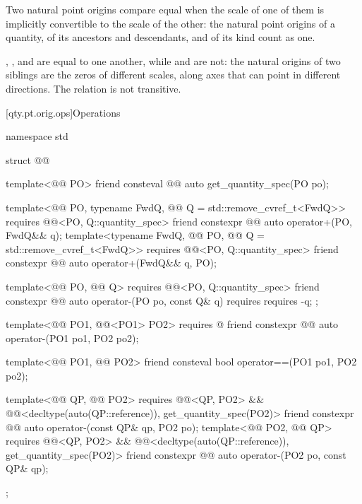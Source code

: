 \pnum
Two natural point origins compare equal
when the scale of one of them is implicitly convertible to the scale of the other:
the natural point origins of a quantity, of its ancestors and descendants, and of its kind count as one.
\begin{note}
, , and
 are equal to one another, while
 and  are not:
the natural origins of two siblings are the zeros of different scales,
along axes that can point in different directions.
The relation is not transitive.
\end{note}

[qty.pt.orig.ops]{Operations}

\begin{codeblock}
namespace std {

struct @@ {
  template<@@ PO>
  friend consteval @@ auto get_quantity_spec(PO po);

  template<@@ PO, typename FwdQ, @@ Q = std::remove_cvref_t<FwdQ>>
    requires @@<PO, Q::quantity_spec>
  friend constexpr @@ auto operator+(PO, FwdQ&& q);
  template<typename FwdQ, @@ PO, @@ Q = std::remove_cvref_t<FwdQ>>
    requires @@<PO, Q::quantity_spec>
  friend constexpr @@ auto operator+(FwdQ&& q, PO);

  template<@@ PO, @@ Q>
    requires @@<PO, Q::quantity_spec>
  friend constexpr @@ auto operator-(PO po, const Q& q)
    requires requires { -q; };

  template<@@ PO1, @@<PO1{}> PO2>
    requires @\seebelownc@
  friend constexpr @@ auto operator-(PO1 po1, PO2 po2);

  template<@@ PO1, @@ PO2>
  friend consteval bool operator==(PO1 po1, PO2 po2);

  template<@@ QP, @@ PO2>
    requires @@<QP, PO2{}> &&
             @@<decltype(auto(QP::reference)), get_quantity_spec(PO2{})>
  friend constexpr @@ auto operator-(const QP& qp, PO2 po);
  template<@@ PO2, @@ QP>
    requires @@<QP, PO2{}> &&
             @@<decltype(auto(QP::reference)), get_quantity_spec(PO2{})>
  friend constexpr @@ auto operator-(PO2 po, const QP& qp);
};

}
\end{codeblock}

